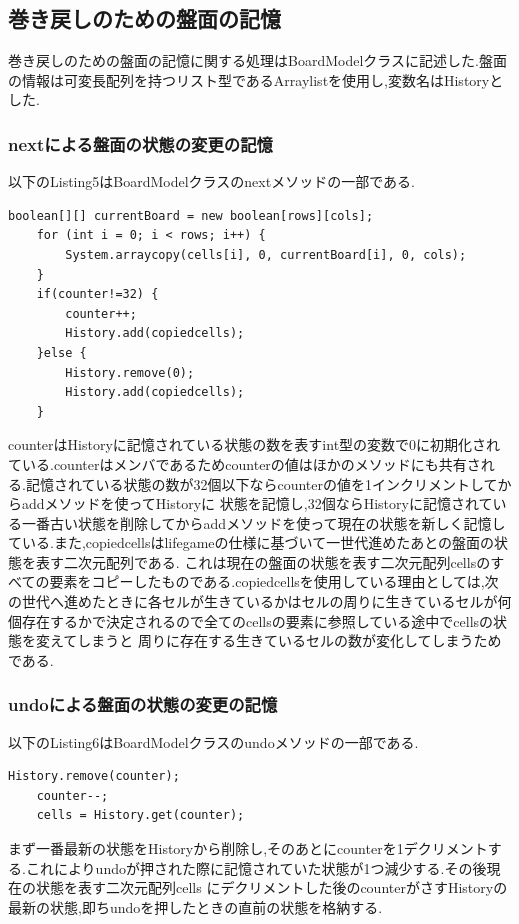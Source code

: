 \documentclass[dvipdfmx]{jarticle}
\begin{document}
\subsection{巻き戻しのための盤面の記憶}
巻き戻しのための盤面の記憶に関する処理はBoardModelクラスに記述した.盤面の情報は可変長配列を持つリスト型であるArraylistを使用し,変数名はHistoryとした.
\subsubsection{nextによる盤面の状態の変更の記憶}
以下のListing5はBoardModelクラスのnextメソッドの一部である.
\begin{lstlisting}[caption=nextメソッドの一部,label=fuga]
    boolean[][] currentBoard = new boolean[rows][cols];
    for (int i = 0; i < rows; i++) {
        System.arraycopy(cells[i], 0, currentBoard[i], 0, cols);
    }
    if(counter!=32) {
        counter++;
        History.add(copiedcells);
    }else {
        History.remove(0);
        History.add(copiedcells);
    }
\end{lstlisting}
counterはHistoryに記憶されている状態の数を表すint型の変数で0に初期化されている.counterはメンバであるためcounterの値はほかのメソッドにも共有される.記憶されている状態の数が32個以下ならcounterの値を1インクリメントしてからaddメソッドを使ってHistoryに
状態を記憶し,32個ならHistoryに記憶されている一番古い状態を削除してからaddメソッドを使って現在の状態を新しく記憶している.また,copiedcellsはlifegameの仕様に基づいて一世代進めたあとの盤面の状態を表す二次元配列である.
これは現在の盤面の状態を表す二次元配列cellsのすべての要素をコピーしたものである.copiedcellsを使用している理由としては,次の世代へ進めたときに各セルが生きているかはセルの周りに生きているセルが何個存在するかで決定されるので全てのcellsの要素に参照している途中でcellsの状態を変えてしまうと
周りに存在する生きているセルの数が変化してしまうためである.
\subsubsection{undoによる盤面の状態の変更の記憶}
以下のListing6はBoardModelクラスのundoメソッドの一部である.
\begin{lstlisting}[caption=undoメソッドの一部,label=fuga]
    History.remove(counter);
    counter--;
    cells = History.get(counter);
\end{lstlisting}
まず一番最新の状態をHistoryから削除し,そのあとにcounterを1デクリメントする.これによりundoが押された際に記憶されていた状態が1つ減少する.その後現在の状態を表す二次元配列cells
にデクリメントした後のcounterがさすHistoryの最新の状態,即ちundoを押したときの直前の状態を格納する.
\end{document}
